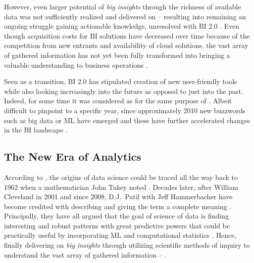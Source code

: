 However, even larger potential of \emph{big insights} through the richness of available data was not sufficiently realized and delivered on -- resulting into remaining an ongoing struggle gaining actionable knowledge, unresolved with \ac{BI} 2.0 \parencite{Kohl2016}.
Even though acquisition costs for \ac{BI} solutions have decreased over time because of the competition from new entrants and availability of cloud solutions, the vast array of gathered information has not yet been fully transformed into bringing a valuable understanding to business operations \parencite{Chen2012}.

Seen as a transition, \ac{BI} 2.0 has stipulated creation of new user-friendly tools while also looking increasingly into the future as opposed to just into the past.
Indeed, for some time it was considered as  for the same purpose of  \parencites[341-343]{Shollo2016TowardsKnowing}{Boris2015}.
Albeit difficult to pinpoint to a specific year, since approximately 2010 new buzzwords such as big data or \ac{ML} have emerged and these have further accelerated changes in the \ac{BI} landscape \parencites{Chen2012}{Larson2016AScience}.

\subsection{The New Era of Analytics}
\label{dssection}
According to \textcite[10]{DavidDonoh2015Years50}, the origins of data science could be traced all the way back to 1962 when a mathematician John Tukey noted . 
Decades later, after William Cleveland in 2001 and since 2008, D.J.\ Patil with Jeff Hammerbacher have become credited with describing and giving the term a complete meaning \parencites{Jifa2014DataScience}{Davenport2012DataCentury}{DavidDonoh2015Years50}{NinaBookR2014}.
Principally, they have all argued that the goal of science of data is finding interesting and robust patterns with great predictive powers that could be practically useful by incorporating \ac{ML} and computational statistics \parencites{Dhar:2013:DSP:2534706.2500499}{Vasconcelos2017}.
Hence, finally delivering on \emph{big insights} through utilizing scientific methods of inquiry to understand the vast array of gathered information --  \parencite[1]{FosterProvost2013DataThinking}. 

